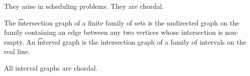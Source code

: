 
\sbasic

























\sstart
{}


They arise in scheduling problems.
They are chordal.


The \t{intersection graph} of a finite family of sets is the undirected graph on the family containing an edge between any two vertices whose intersection is non-empty.
An \t{interval graph} is the intersection graph of a family of intervals on the real line.



\begin{prop}

  All interval graphs are chordal.

\end{prop}
\strats
